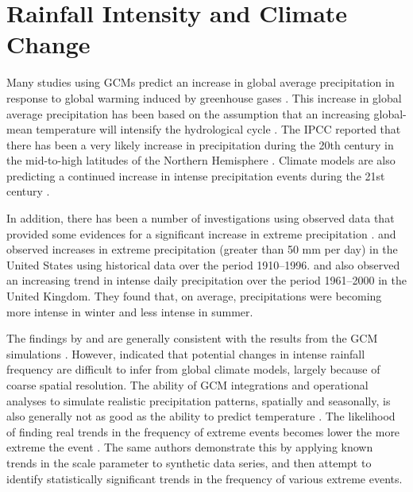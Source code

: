\section{Rainfall Intensity and Climate Change}
\label{sec:RainfallIntensityAndClimateChange}

Many studies using GCMs predict an increase in global average precipitation in
response to global warming induced by greenhouse gases
\citep{houghton1996-climate,jones2001-1337,ipcc2001-881,ipcc2001-1032,
ipcc2007-impact,ipcc2007-physical}. This increase in global average
precipitation has been based on the assumption that an increasing global-mean
temperature will intensify the hydrological cycle
\citep{nearing2005-131}. The IPCC reported that there has been a very
likely increase in precipitation during the 20th century in the mid-to-high
latitudes of the Northern Hemisphere \citep{ipcc2001-881,ipcc2007-physical}.
Climate models are also predicting a continued increase in intense precipitation
events during the 21st century \citep{ipcc2001-1032,ipcc2007-impact}.

In addition, there has been a number of investigations using observed data
that provided some evidences for a significant increase in extreme precipitation
\citep{karl1995-217,karl1998-231,osborn2000-347,osborn2002-1313}.
\citet{karl1995-217} and \citet{karl1998-231} observed increases in extreme
precipitation (greater than 50 mm per day) in the United States using historical
data over the period 1910--1996. \citet{osborn2000-347} and
\citet{osborn2002-1313} also observed an increasing trend in intense daily
precipitation over the period 1961--2000 in the United Kingdom. They found that,
on average, precipitations were becoming more intense in winter and less intense
in summer.

The findings by \citet{osborn2000-347} and \citet{osborn2002-1313} are generally
consistent with the results from the GCM simulations
\citep{jones1997-265,jones2001-1337}. However,
\citet{ipcc2001-1032,ipcc2001-881} indicated that potential changes in intense
rainfall frequency are difficult to infer from global climate models, largely
because of coarse spatial resolution. The ability of GCM integrations and
operational analyses to simulate realistic precipitation patterns, spatially and
seasonally, is also generally not as good as the ability to predict temperature
\citep{mcguffie1999-1}. The likelihood of finding real trends in the frequency
of extreme events becomes lower the more extreme the event
\citep{frei2001-1568}. The same authors demonstrate this by applying known
trends in the scale parameter to synthetic data series, and then attempt to
identify statistically significant trends in the frequency of various extreme
events.


